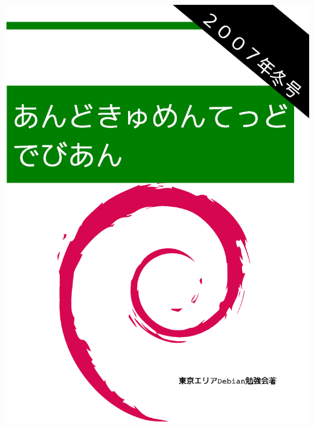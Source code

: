 \documentclass[mingoth,a4paper]{jsarticle}
\begin{document}
\begin{titlepage}
\includegraphics[height=252mm]{image2007-fuyu/2007-winter.eps}
\end{titlepage}
\end{document}
